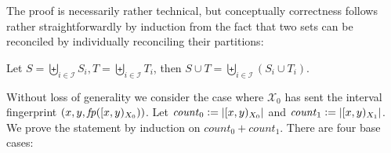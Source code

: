 The proof is necessarily rather technical, but conceptually correctness follows rather straightforwardly by induction from the fact that two sets can be reconciled by individually reconciling their partitions:

\begin{proposition}
\label{partition-union}
Let $S = \biguplus_{i \in \mathcal{I}} S_i, T = \biguplus_{i \in \mathcal{I}} T_i$, then $S \cup T = \biguplus_{i \in \mathcal{I}} (S_i \cup T_i)$.
\end{proposition}

\newcommand{\intcount}[1]{\mathit{count}_{#1}}

Without loss of generality we consider the case where $\mathcal{X}_0$ has sent the interval fingerprint $({x}, {y}, {\mathit{fp}([{x},{y})_{X_0})})$. Let $\intcount{0} \defeq \abs{\interval{x}{y}{X_0}}$ and $\intcount{1} \defeq \abs{\interval{x}{y}{X_1}}$.
We prove the statement by induction on $\intcount{0} + \intcount{1}$. There are four base cases:

